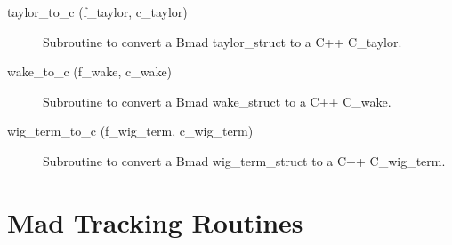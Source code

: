 \begin{description}
\item[taylor\_to\_c (f\_taylor, c\_taylor)] \Newline 
Subroutine to convert a Bmad taylor\_struct to a C++ C\_taylor.

\item[wake\_to\_c (f\_wake, c\_wake)] \Newline 
Subroutine to convert a Bmad wake\_struct to a C++ C\_wake.

\item[wig\_term\_to\_c (f\_wig\_term, c\_wig\_term)] \Newline 
Subroutine to convert a Bmad wig\_term\_struct to a C++ C\_wig\_term.

\end{description}

\section{Mad Tracking Routines}
\label{r:mad}      

